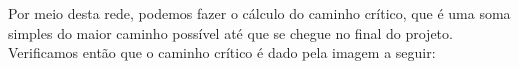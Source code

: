 \documentclass[12pt,a4paper,final]{article}
\begin{document}
Por meio desta rede, podemos fazer o cálculo do caminho crítico, que é uma soma simples do maior caminho possível até que se chegue no final do projeto. Verificamos então que o caminho crítico é dado pela imagem a seguir:
\begin{figure}
\end{figure}
\end{document}

